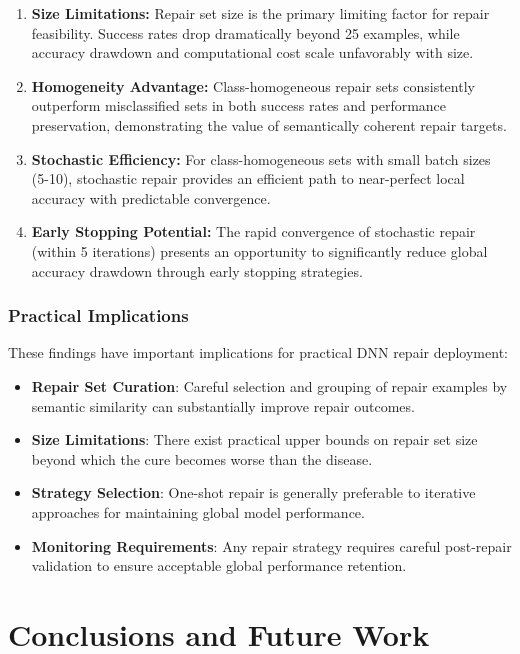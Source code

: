 \documentclass{article}
\begin{document}
\begin{enumerate}
	\item \textbf{Size Limitations:} Repair set size is the primary limiting factor for repair feasibility. Success rates drop dramatically beyond 25 examples, while accuracy drawdown and computational cost scale unfavorably with size.

	\item \textbf{Homogeneity Advantage:} Class-homogeneous repair sets consistently outperform misclassified sets in both success rates and performance preservation, demonstrating the value of semantically coherent repair targets.

	\item \textbf{Stochastic Efficiency:} For class-homogeneous sets with small batch sizes (5-10), stochastic repair provides an efficient path to near-perfect local accuracy with predictable convergence.

	\item \textbf{Early Stopping Potential:} The rapid convergence of stochastic repair (within 5 iterations) presents an opportunity to significantly reduce global accuracy drawdown through early stopping strategies.
\end{enumerate}

\subsubsection{Practical Implications}

These findings have important implications for practical DNN repair deployment:

\begin{itemize}
	\item \textbf{Repair Set Curation}: Careful selection and grouping of repair examples by semantic similarity can substantially improve repair outcomes.
	\item \textbf{Size Limitations}: There exist practical upper bounds on repair set size beyond which the cure becomes worse than the disease.
	\item \textbf{Strategy Selection}: One-shot repair is generally preferable to iterative approaches for maintaining global model performance.
	\item \textbf{Monitoring Requirements}: Any repair strategy requires careful post-repair validation to ensure acceptable global performance retention.
\end{itemize}

\section{Conclusions and Future Work}
\end{document}
